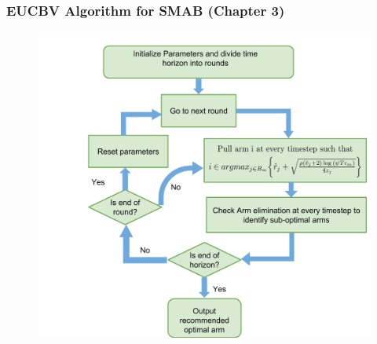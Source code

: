 \begin{frame}
\frametitle{EUCBV Algorithm for SMAB ({Chapter 3})}
\begin{figure}
\includegraphics[scale=0.24]{img/EUCBV_flow.png}
\end{figure}
\end{frame}